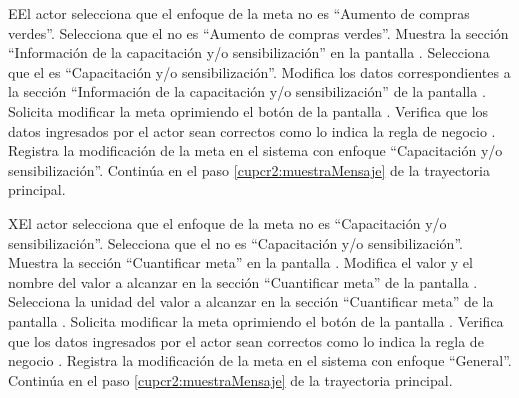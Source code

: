 \begin{UCtrayectoriaA}{E}{El actor selecciona que el enfoque de la meta no es ``Aumento de compras verdes''.}
	\UCpaso[\UCactor] Selecciona que el  no es ``Aumento de compras verdes''. 
	\UCpaso[\UCsist] Muestra la sección ``Información de la capacitación y/o sensibilización'' en la pantalla .
	\UCpaso[\UCactor] Selecciona que el  es ``Capacitación y/o sensibilización''. 
	\UCpaso[\UCactor] Modifica los datos correspondientes a la sección ``Información de la capacitación y/o sensibilización'' de la pantalla .
	\UCpaso[\UCactor] Solicita modificar la meta oprimiendo el botón  de la pantalla .  
	\UCpaso[\UCsist] Verifica que los datos ingresados por el actor sean correctos como lo indica la regla de negocio .   
	\UCpaso[\UCsist] Registra la modificación de la meta en el sistema con enfoque ``Capacitación y/o sensibilización''.
	\UCpaso[] Continúa en el paso \ref{cupcr2:muestraMensaje} de la trayectoria principal.
\end{UCtrayectoriaA}


\begin{UCtrayectoriaA}{X}{El actor selecciona que el enfoque de la meta no es ``Capacitación y/o sensibilización''.}
	\UCpaso[\UCactor] Selecciona que el  no es ``Capacitación y/o sensibilización''. 
	\UCpaso[\UCsist] Muestra la sección ``Cuantificar meta'' en la pantalla .
	\UCpaso[\UCactor] Modifica el valor y el nombre del valor a alcanzar en la sección ``Cuantificar meta'' de la pantalla .
	\UCpaso[\UCactor] Selecciona la unidad del valor a alcanzar en la sección ``Cuantificar meta'' de la pantalla . 
	\UCpaso[\UCactor] Solicita modificar la meta oprimiendo el botón  de la pantalla .  
	\UCpaso[\UCsist] Verifica que los datos ingresados por el actor sean correctos como lo indica la regla de negocio .   
	\UCpaso[\UCsist] Registra la modificación de la meta en el sistema con enfoque ``General''.
	\UCpaso[] Continúa en el paso \ref{cupcr2:muestraMensaje} de la trayectoria principal.
\end{UCtrayectoriaA}

